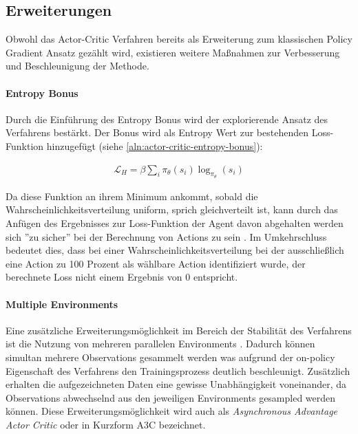 \documentclass[11pt]{scrartcl}
\begin{document}
\subsection{Erweiterungen}
Obwohl das Actor-Critic Verfahren bereits als Erweiterung zum klassischen Policy Gradient Ansatz
gezählt wird, existieren weitere Maßnahmen zur Verbesserung und Beschleunigung der Methode.

\paragraph*{Entropy Bonus} 
\noindent
\newline
Durch die Einführung des Entropy Bonus wird der explorierende Ansatz des Verfahrens bestärkt.
Der Bonus wird als Entropy Wert zur bestehenden Loss-Funktion hinzugefügt (siehe
\ref{aln:actor-critic-entropy-bonus}):

\begin{align}
\mathcal{L}_H=\beta\sum_i\pi_\theta(s_i)\log_{\pi_\theta}(s_i)
\label{aln:actor-critic-entropy-bonus}
\end{align}

Da diese Funktion an ihrem Minimum ankommt, sobald die Wahrscheinlichkeitsverteilung uniform,
sprich gleichverteilt ist, kann durch das Anfügen des Ergebnisses zur Loss-Funktion der
Agent davon abgehalten werden sich ''zu sicher'' bei der Berechnung von Actions zu sein
\cite[~S.269 f.]{L2018}. Im Umkehrschluss bedeutet dies, dass bei einer
Wahrscheinlichkeitsverteilung bei der ausschließlich eine Action zu 100 Prozent als wählbare
Action identifiziert wurde, der berechnete Loss nicht einem Ergebnis von 0 entspricht.

\paragraph*{Multiple Environments} 
\label{sec:multiple_envs}
\noindent
\newline
Eine zusätzliche Erweiterungsmöglichkeit im Bereich der Stabilität des Verfahrens ist die Nutzung
von mehreren parallelen Environments \cite[~S.270]{L2018}. Dadurch können simultan mehrere
Observations gesammelt werden was aufgrund der on-policy Eigenschaft des Verfahrens den
Trainingsprozess deutlich beschleunigt. Zusätzlich erhalten die aufgezeichneten Daten eine
gewisse Unabhängigkeit voneinander, da Observations abwechselnd aus den jeweiligen Environments
gesampled werden können. Diese Erweiterungsmöglichkeit wird auch als \textit{Asynchronous Advantage
Actor Critic} oder in Kurzform A3C bezeichnet.
\end{document}
